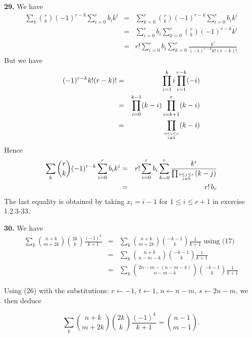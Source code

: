 \documentclass[a4paper,12pt]{article}
\newcommand{\newpar}[1]{\bigskip \noindent \textbf{#1.}}
\newcommand{\la}{\leftarrow}
\begin{document}
\newpar{29} We have
\begin{eqnarray*}
  \sum_k {r \choose k} (-1)^{r-k} \sum_{i=0}^r b_i k^i &=&
  \sum_{k=0}^r {r \choose k} (-1)^{r-k} \sum_{i=0}^r b_i k^i \\
  &=& \sum_{i=0}^r b_i \sum_{k=0}^r {r \choose k} (-1)^{r-k} k^i \\
  &=& r! \sum_{i=0}^r b_i \sum_{k=0}^r \frac{k^i}{(-1)^{r-k}k!(r-k)!}
\end{eqnarray*}
But we have
\begin{eqnarray*}
  (-1)^{r-k}k! (r-k)! &=& \prod_{i=1}^k i \prod_{i=1}^{r-k}(-i) \\
  &=& \prod_{i=0}^{k-1} (k-i) \prod_{i=k+1}^r (k-i) \\
  &=& \prod_{0\le i \le r \atop i\not=k} (k-i)
\end{eqnarray*}
Hence
\begin{eqnarray*}
  \sum_k {r \choose k} (-1)^{r-k} \sum_{i=0}^r b_i k^i &=& r!
  \sum_{i=0}^r b_i \sum_{k=0}^r \frac{k^i}{\prod_{0\le j \le r\atop
      j\not=k} (k-j)} \\
  &=& r!\,b_r
\end{eqnarray*}
The last equality is obtained by taking $x_i = i-1$ for $1\le i\le
r+1$ in exercise 1.2.3-33.

\newpar{30}  We have
\begin{eqnarray*}
  \sum_k {n+k \choose m+2k} {2k \choose k} \frac{(-1)^k}{k+1} &=&
  \sum_k {n+k \choose m+2k} {-k-1 \choose k} \frac{1}{k+1}\mbox{ using
    (17)} \\
  &=& \sum_k {n+k \choose n-m -k} {-k-1 \choose k} \frac{1}{k+1} \\
  &=& \sum_k {2n - m - (n-m -k) \choose n-m-k}{-k-1\choose k} \frac{1}{k+1}
\end{eqnarray*}

Using (26) with the substitutions: $r \la -1$, $t \la 1$, $n \la n-m$,
$s \la 2n - m$, we then deduce

\[ \sum_k {n+k \choose m+2k} {2k \choose k} \frac{(-1)^k}{k+1} = {n-1
  \choose m-1}.\]
\end{document}
